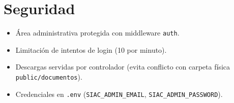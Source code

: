 \section{Seguridad}
\begin{itemize}
  \item Área administrativa protegida con middleware \texttt{auth}.
  \item Limitación de intentos de login (10 por minuto).
  \item Descargas servidas por controlador (evita conflicto con carpeta física \texttt{public/documentos}).
  \item Credenciales en \texttt{.env} (\texttt{SIAC\_ADMIN\_EMAIL}, \texttt{SIAC\_ADMIN\_PASSWORD}).
\end{itemize}
